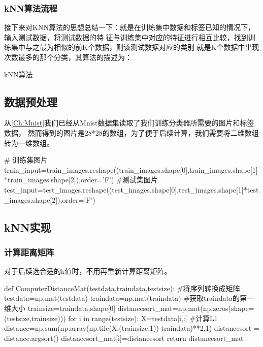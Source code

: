\subsubsection{kNN算法流程}
接下来对KNN算法的思想总结一下：就是在训练集中数据和标签已知的情况下，输入测试数据，将测试数据的特
征与训练集中对应的特征进行相互比较，找到训练集中与之最为相似的前K个数据，则该测试数据对应的类别
就是K个数据中出现次数最多的那个分类，其算法的描述为：
\begin{algorithm}
  \caption{kNN算法}
  \label{alg:kNN}
  \begin{algorithmic}
  \end{algorithmic}
\end{algorithm}

\subsection{数据预处理}
从\ref{Ch:Mnist}我们已经从Mnist数据集读取了我们训练分类器所需要的图片和标签数据，
然而得到的图片是28*28的数组，为了便于后续计算，我们需要将二维数组转为一维数组。
\begin{python}
  # 训练集图片
  train_input=train_images.reshape((train_images.shape[0],train_images.shape[1]*train_images.shape[2]),order='F')
  #测试集图片
  test_input=test_images.reshape((test_images.shape[0],test_images.shape[1]*test_images.shape[2]),order='F')
\end{python}

\subsection{kNN实现}
\subsubsection{计算距离矩阵}
对于后续选合适的k值时，不用再重新计算距离矩阵。
\begin{python}
  def ComputerDistanceMat(testdata,traindata,testsize):
    #将序列转换成矩阵
    testdata=np.mat(testdata)   
    traindata=np.mat(traindata)
    #获取traindata的第一维大小
    trainsize=traindata.shape[0]
    distancesort_mat=np.mat(np.zeros(shape=(testsize,trainsize)))
    for i in range(testsize):
        X=testdata[i,:]
        #计算L1
        distance=np.sum(np.array(np.tile(X,(trainsize,1))-traindata)**2,1)
        distancesort = distance.argsort()
        distancesort_mat[i]=distancesort
    return distancesort_mat
\end{python}

